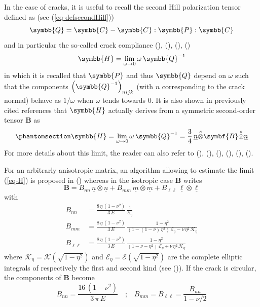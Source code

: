 \documentclass[
  a4paper,
  numbers=noendperiod,
  DIV=12]{scrreprt}
\newcommand{\uu}[1]{{\symbf{{#1}}}}
\newcommand{\uuuu}[1]{{\symbb{{#1}}}}
\newcommand{\uv}[1]{{\underline{{#1}}}}
\newcommand{\sotimes}{{\stackrel{s}{\otimes}}}
\begin{document}
In the case of cracks, it is useful to recall the second Hill
polarization tensor defined as (see (\ref{eq-defsecondHill})) \[
\uuuu{Q}=\uuuu{C}-\uuuu{C}:\uuuu{P}:\uuuu{C}
\] and in particular the so-called crack compliance
(),
(),
(),
() \[
\uuuu{H}=\lim_{\omega\to 0}\omega\,\uuuu{Q}^{-1}
\] in which it is recalled that \(\uuuu{P}\) and thus \(\uuuu{Q}\)
depend on \(\omega\) such that the components
\(\left(\uuuu{Q}^{-1}\right)_{nijk}\) (with \(n\) corresponding to the
crack normal) behave as \(1/\omega\) when \(\omega\) tends towards
\(0\). It is also shown in previously cited references that \(\uuuu{H}\)
actually derives from a symmetric second-order tensor \(\uu{B}\) as
\begin{equation}\protect\phantomsection\label{eq-H}{
\uuuu{H}=
\lim_{\omega\to 0} \omega\,\uuuu{Q}^{-1}
=\frac{3}{4}\,\uv{n}\sotimes\uu{B}\sotimes\uv{n}
}\end{equation} For more details about this limit, the reader can also
refer to (),
(),
(),
(),
(),
().

For an arbitrarly anisotropic matrix, an algorithm allowing to estimate
the limit (\ref{eq-H}) is proposed in
() whereas in
the isotropic case \(\uu{B}\) writes \[
\uu{B}=
B_{nn}\,\uv{n}\otimes\uv{n}
+
B_{mm}\,\uv{m}\otimes\uv{m}
+
B_{\ell\ell}\,\uv{\ell}\otimes\uv{\ell}
\] with \begin{align}
B_{nn}&=\frac{8\,\eta\,(1-\nu^2)}{3\,E}\,
\frac{1}{\mathcal{E}_\eta}\label{eq:Bnn}\\
B_{mm}&=\frac{8\,\eta\,(1-\nu^2)}{3\,E}\,
\frac{1-\eta^2}{\left(1-(1-\nu)\,\eta^2\right)
\,\mathcal{E}_\eta-\nu\,\eta^2\,\mathcal{K}_\eta}\\
B_{\ell\ell}&=\frac{8\,\eta\,(1-\nu^2)}{3\,E}\,
\frac{1-\eta^2}{(1-\nu-\eta^2)\,\mathcal{E}_\eta+\nu\,\eta^2\,\mathcal{K}_\eta}
\end{align} where \(\mathcal{K}_\eta=\mathcal{K}(\sqrt{1-\eta^2})\) and
\(\mathcal{E}_\eta=\mathcal{E}(\sqrt{1-\eta^2})\) are the complete
elliptic integrals of respectively the first and second kind (see
()). If the
crack is circular, the components of \(\uu{B}\) become \[
B_{nn}=\frac{16\,(1-\nu^2)}{3\,\pi\,E}
\quad\textrm{;}\quad
B_{mm}=B_{\ell\ell}=\frac{B_{nn}}{1-\nu/2}
\]
\end{document}
